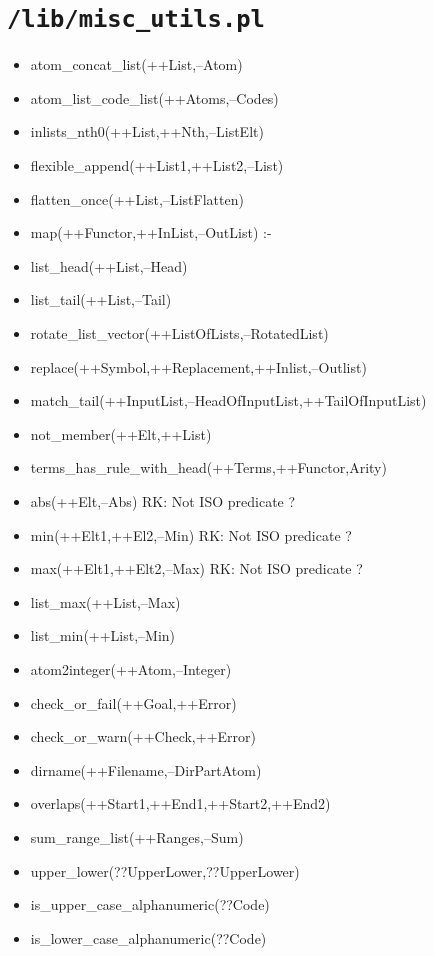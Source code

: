 \section{\texttt{/lib/misc\_utils.pl}}
%
\begin{itemize}
\item atom\_concat\_list(++List,--Atom)
\item atom\_list\_code\_list(++Atoms,--Codes)
\item inlists\_nth0(++List,++Nth,--ListElt)
\item flexible\_append(++List1,++List2,--List)
\item flatten\_once(++List,--ListFlatten)
\item map(++Functor,++InList,--OutList) :-
\item list\_head(++List,--Head)
\item list\_tail(++List,--Tail)
\item rotate\_list\_vector(++ListOfLists,--RotatedList) 
\item replace(++Symbol,++Replacement,++Inlist,--Outlist)
\item match\_tail(++InputList,--HeadOfInputList,++TailOfInputList)
\item not\_member(++Elt,++List)
\item terms\_has\_rule\_with\_head(++Terms,++Functor,Arity)
\item abs(++Elt,--Abs)  RK: Not ISO predicate ?        
\item min(++Elt1,++El2,--Min)   RK: Not ISO predicate ?
\item max(++Elt1,++Elt2,--Max)  RK: Not ISO predicate ?
\item list\_max(++List,--Max)
\item list\_min(++List,--Min)
\item atom2integer(++Atom,--Integer)
\item check\_or\_fail(++Goal,++Error)
\item check\_or\_warn(++Check,++Error)
\item dirname(++Filename,--DirPartAtom)
\item overlaps(++Start1,++End1,++Start2,++End2)
\item sum\_range\_list(++Ranges,--Sum)
\item upper\_lower(??UpperLower,??UpperLower)
\item is\_upper\_case\_alphanumeric(??Code)
\item is\_lower\_case\_alphanumeric(??Code)
\end{itemize}


